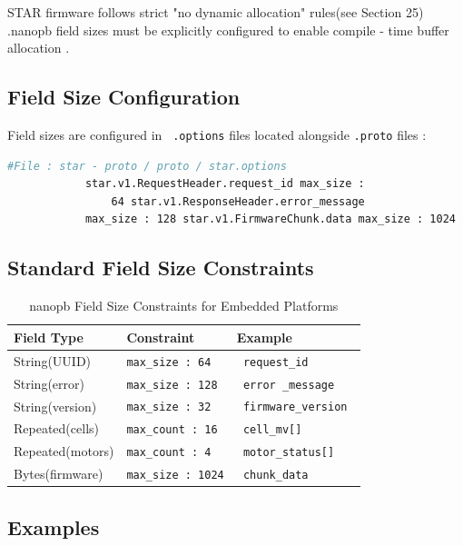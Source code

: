                   STAR firmware follows strict
                  "no dynamic allocation" rules(see Section 25)
                      .nanopb field sizes must be explicitly configured to
                          enable compile -
            time buffer allocation
                .

\subsection{Field Size Configuration}

            Field sizes are configured in \texttt{
                .options} files located alongside \texttt{.proto} files :

\begin{lstlisting}[language = bash]
#File : star - proto / proto / star.options
            star.v1.RequestHeader.request_id max_size :
                64 star.v1.ResponseHeader.error_message
            max_size : 128 star.v1.FirmwareChunk.data max_size : 1024


\end{lstlisting}
\subsection{Standard Field Size Constraints}

\begin{table}[H]
\centering
\caption{nanopb Field Size Constraints for Embedded Platforms}
\label{tab:nanopb-constraints}
\begin{tabular} { | l | l | l |}
\hline
\textbf{Field Type} & \textbf{Constraint} & \textbf{Example}
\\
\hline String(UUID) & \texttt{max\_size : 64} & \texttt { request\_id}
\\
\hline String(error) & \texttt{max\_size : 128} & \texttt { error \_message}
\\
\hline String(version) & \texttt{max\_size : 32} & \texttt {
  firmware\_version
}
\\
\hline Repeated(cells) & \texttt{max\_count : 16} & \texttt { cell\_mv[]}
\\
\hline Repeated(motors) & \texttt{max\_count : 4} & \texttt {
  motor\_status[]
}
\\
\hline Bytes(firmware) & \texttt{max\_size : 1024} & \texttt { chunk\_data}
\\
\hline
\end{tabular}
\end{table}

\subsection{Examples}

